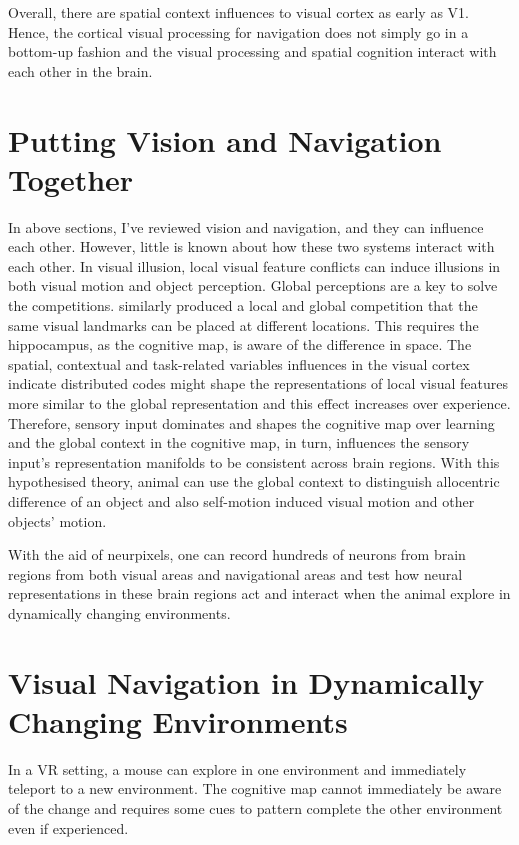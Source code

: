 Overall, there are spatial context influences to visual cortex as early as V1. Hence, the cortical  visual processing for navigation does not simply go in a bottom-up fashion and the visual processing and spatial cognition interact with each other in the brain. 

\section{Putting Vision and Navigation Together}
In above sections, I've reviewed vision and navigation, and they can influence each other. However, little is known about how these two systems interact with each other. In visual illusion, local visual feature conflicts can induce illusions in both visual motion and object perception. Global perceptions are a key to solve the competitions. \cite{saleem_coherent_2018, mika_diamanti_spatial_2021} similarly produced a local and global competition that the same visual landmarks can be placed at different locations. This requires the hippocampus, as the cognitive map, is aware of the difference in space. The spatial, contextual and task-related variables influences in the visual cortex indicate distributed codes might shape the representations of local visual features more similar to the global representation and this effect increases over experience. Therefore, sensory input dominates and shapes the cognitive map over learning and the global context in the cognitive map, in turn, influences the sensory input's representation manifolds to be consistent across brain regions. With this hypothesised theory, animal can use the global context to distinguish allocentric difference of an object and also self-motion induced visual motion and other objects' motion.

With the aid of neurpixels, one can record hundreds of neurons from brain regions from both visual areas and navigational areas and test how neural representations in these brain regions act and interact when the animal explore in dynamically changing environments.

\section{Visual Navigation in Dynamically Changing Environments}
In a VR setting, a mouse can explore in one environment and immediately teleport to a new environment. The cognitive map cannot immediately be aware of the change and requires some cues to pattern complete the other environment even if experienced. 



